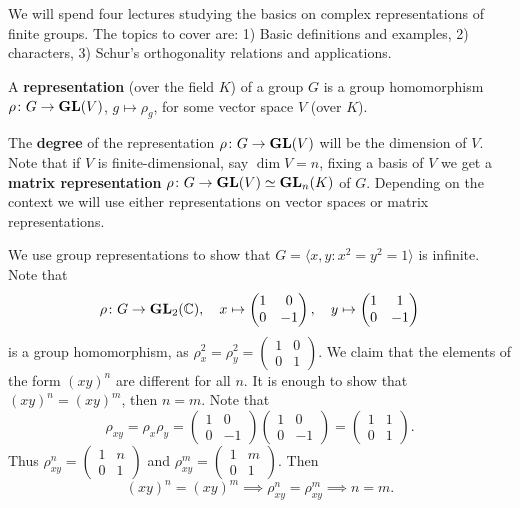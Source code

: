 \chapter{}


We will spend 
four lectures studying the basics on complex representations of finite groups. 
The topics to cover are: 1) Basic definitions and examples, 2) characters, 3)
Schur's orthogonality relations and applications. 

\begin{definition}
	A \textbf{representation} (over the field $K$) of a group $G$ is a group homomorphism
	$\rho\colon G\to\mathbf{GL}(V)$, $g\mapsto\rho_g$, for some vector space $V$ (over $K$).
\end{definition}

The \textbf{degree} of the representation $\rho\colon G\to\mathbf{GL}(V)$ will be the dimension of $V$. Note that
if $V$ is finite-dimensional, say $\dim V=n$, fixing a basis of $V$ we get a \textbf{matrix representation} 
$\rho\colon G\to\mathbf{GL}(V)\simeq\mathbf{GL}_n(K)$ of $G$. Depending on the context we will use either
representations on vector spaces or matrix representations.  

\begin{example}
	We use group representations to show that 
	$G=\langle x,y:x^2=y^2=1\rangle$ is infinite. Note that
	\[
	\rho\colon G\to\mathbf{GL}_2(\mathbb{C}),
	\quad
	x\mapsto\begin{pmatrix}
		1&0\\
		0&-1	
	\end{pmatrix},\quad
 	y\mapsto\begin{pmatrix}
		1&1\\
		0&-1	
	\end{pmatrix}
 	\]
 	is a group homomorphism, as 
 	$\rho_x^2=\rho_y^2=\begin{pmatrix}
		1&0\\
		0&1	
	\end{pmatrix}$. We claim that the elements of the form $(xy)^n$ are
	different for all $n$. It is enough to show that   
	$(xy)^n=(xy)^m$, then $n=m$. Note that
	\[
	\rho_{xy}=\rho_x\rho_y=\begin{pmatrix}
		1&0\\
		0&-1	
	\end{pmatrix}
	\begin{pmatrix}
		1&0\\
		0&-1	
	\end{pmatrix}
	=\begin{pmatrix}
		1&1\\
		0&1	
	\end{pmatrix}.
	\]
	Thus $\rho_{xy}^n=\begin{pmatrix}
		1&n\\
		0&1	
	\end{pmatrix}$ and 
	$\rho_{xy}^m=\begin{pmatrix}
		1&m\\
		0&1	
	\end{pmatrix}$. Then 
	\[
	(xy)^n=(xy)^m\implies\rho_{xy}^n=\rho_{xy}^m\implies n=m.
	\] 
\end{example}

